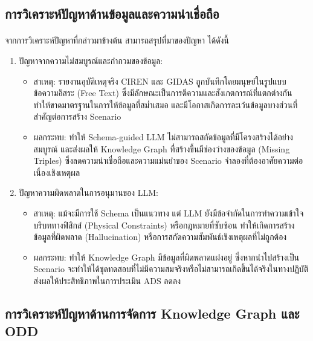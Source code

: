 \subsection{การวิเคราะห์ปัญหาด้านข้อมูลและความน่าเชื่อถือ}\label{subsec:data-reliability-analysis}

\paragraph{}จากการวิเคราะห์ปัญหาที่กล่าวมาข้างต้น สามารถสรุปที่มาของปัญหา ได้ดังนี้

\begin{enumerate}[label=\arabic*.)]
    \item ปัญหาจากความไม่สมบูรณ์และกำกวมของข้อมูล:
    \begin{itemize}
        \item สาเหตุ: รายงานอุบัติเหตุจริง CIREN และ GIDAS ถูกบันทึกโดยมนุษย์ในรูปแบบข้อความอิสระ (Free Text) ซึ่งมีลักษณะเป็นการตีความและสังเกตการณ์ที่แตกต่างกัน ทำให้ขาดมาตรฐานในการให้ข้อมูลที่สม่ำเสมอ และมีโอกาสเกิดการละเว้นข้อมูลบางส่วนที่สำคัญต่อการสร้าง Scenario
        \item ผลกระทบ: ทำให้ Schema-guided LLM ไม่สามารถสกัดข้อมูลที่มีโครงสร้างได้อย่างสมบูรณ์ และส่งผลให้ Knowledge Graph ที่สร้างขึ้นมีช่องว่างของข้อมูล (Missing Triples) ซึ่งลดความน่าเชื่อถือและความแม่นยำของ Scenario จำลองที่ต้องอาศัยความต่อเนื่องเชิงเหตุผล
    \end{itemize}
    \item ปัญหาความผิดพลาดในการอนุมานของ LLM:
    \begin{itemize}
        \item สาเหตุ: แม้จะมีการใช้ Schema เป็นแนวทาง แต่ LLM ยังมีข้อจำกัดในการทำความเข้าใจบริบททางฟิสิกส์ (Physical Constraints) หรือกฎหมายที่ซับซ้อน ทำให้เกิดการสร้างข้อมูลที่ผิดพลาด (Hallucination) หรือการสกัดความสัมพันธ์เชิงเหตุผลที่ไม่ถูกต้อง
        \item ผลกระทบ: ทำให้ Knowledge Graph มีข้อมูลที่ผิดพลาดแฝงอยู่ ซึ่งหากนำไปสร้างเป็น Scenario จะทำให้ได้ชุดทดสอบที่ไม่มีความสมจริงหรือไม่สามารถเกิดขึ้นได้จริงในทางปฏิบัติ ส่งผลให้ประสิทธิภาพในการประเมิน ADS ลดลง
    \end{itemize}
\end{enumerate}

\subsection{การวิเคราะห์ปัญหาด้านการจัดการ Knowledge Graph และ ODD}\label{subsec:kg-odd-management-analysis}

